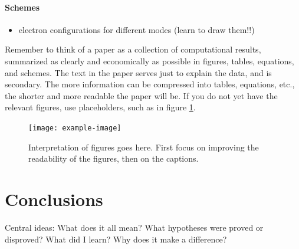 \documentclass[twoside,twocolumn,9pt]{article}
\renewcommand{\refname}{Notes and references}
\begin{document}
\paragraph*{Schemes}
\begin{itemize}
  \item electron configurations for different modes (learn to draw them!!)
\end{itemize}
Remember to think of a paper as a collection of computational results, summarized as clearly and economically as possible in figures, tables, equations, and schemes. The text in the paper serves just to explain the data, and is secondary. The more information can be compressed into tables, equations, etc., the shorter and more readable the paper will be. If you do not yet have the relevant figures, use placeholders, such as in figure \ref{fig:my_label}.

\begin{center}
    \begin{figure}
        \texttt{[image: example-image]}
        \caption{Interpretation of figures goes here. First focus on improving the readability of the figures, then on the captions.}
        \label{fig:my_label}
    \end{figure}
\end{center}

\section{Conclusions}

Central ideas: What does it all mean? What hypotheses were proved or disproved? What did I learn? Why does it make a difference?




\balance


\end{document}
